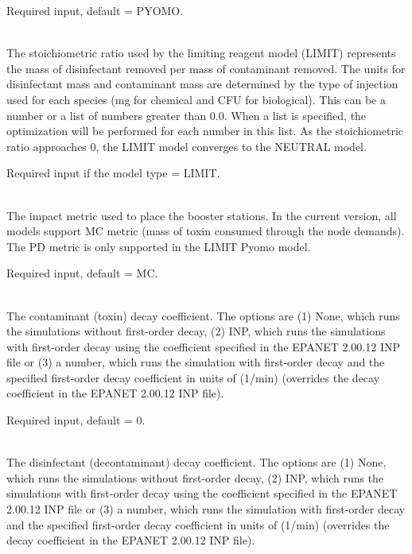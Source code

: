 \begin{description}[topsep=0pt,parsep=0.5em,itemsep=-0.4em]
\begin{description}[topsep=0pt,parsep=0.5em,itemsep=-0.4em]
                Required input, default = PYOMO.
    \item[{stoichiometric ratio}]\hfill
\\The stoichiometric ratio used by the limiting reagent
                model (LIMIT) represents the mass of disinfectant removed per 
                mass of contaminant removed. The units for disinfectant mass 
                and contaminant mass are determined by the type of injection used 
                for each species (mg for chemical and CFU for biological).  
                This can be a number or a list of
                numbers greater than 0.0. When a list is specified, the
                optimization will be performed for each number in this list. As
                the stoichiometric ratio approaches 0, the LIMIT model converges 
                to the NEUTRAL model.
                
                Required input if the model type = LIMIT.
    \item[{objective}]\hfill
\\The impact metric used to place the booster stations.
                In the current version, all models support MC metric
                (mass of toxin consumed through the node demands). The
                PD metric is only supported in the LIMIT Pyomo model.                
                
                Required input, default = MC.
    \item[{toxin decay coefficient}]\hfill
\\The contaminant (toxin) decay coefficient. The options are 
				(1) None, which runs the simulations without first-order decay, 
				(2) INP, which runs the simulations with first-order decay using the
                coefficient specified in the EPANET 2.00.12 INP file or (3) a number, which 
				runs the simulation with first-order decay and the specified first-order
				decay coefficient in units of (1/min) (overrides the decay coefficient 
				in the EPANET 2.00.12 INP file).
                
                Required input, default = 0.
    \item[{decon decay coefficient}]\hfill
\\The disinfectant (decontaminant) decay coefficient. The options are 
				(1) None, which runs the simulations without first-order decay, 
				(2) INP, which runs the simulations with first-order decay using the
                coefficient specified in the EPANET 2.00.12 INP file or (3) a number, which 
				runs the simulation with first-order decay and the specified first-order
				decay coefficient in units of (1/min) (overrides the decay coefficient 
				in the EPANET 2.00.12 INP file).
                

\end{description}
\end{description}
